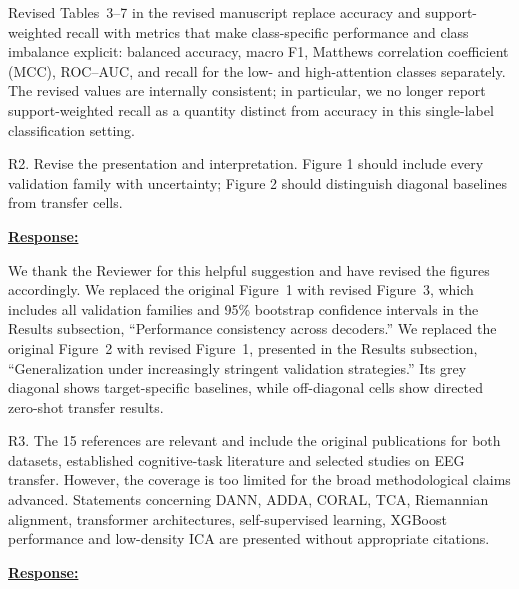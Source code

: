 \documentclass{article}
\begin{document}
Revised Tables~3--7 in the revised manuscript replace accuracy and support-weighted recall with metrics
that make class-specific performance and class imbalance explicit: balanced
accuracy, macro F1, Matthews correlation coefficient (MCC), ROC--AUC, and
recall for the low- and high-attention classes separately. The revised values are
internally consistent; in particular, we no longer report support-weighted
recall as a quantity distinct from accuracy in this single-label classification
setting.

\vspace{0.3cm}


\begin{cmt}{}{}

R2. Revise the presentation and interpretation. Figure 1 should include every
validation family with uncertainty; Figure 2 should distinguish diagonal
baselines from transfer cells.

\end{cmt}
\vspace{0.1cm}
\noindent
\underline{\textbf{Response:}}
\vspace{0.2cm}

We thank the Reviewer for this helpful suggestion and have revised the figures
accordingly. We replaced the original Figure~1 with revised Figure~3, which
includes all validation families and 95\% bootstrap confidence intervals in the
Results subsection, ``Performance consistency across decoders.'' We replaced
the original Figure~2 with revised Figure~1, presented in the Results
subsection, ``Generalization under increasingly stringent validation
strategies.'' Its grey diagonal shows target-specific baselines, while
off-diagonal cells show directed zero-shot transfer results.

\vspace{0.3cm}


\begin{cmt}{}{}

R3. The 15 references are relevant and include the original publications for
both datasets, established cognitive-task literature and selected studies on EEG
transfer. However, the coverage is too limited for the broad methodological
claims advanced. Statements concerning DANN, ADDA, CORAL, TCA, Riemannian
alignment, transformer architectures, self-supervised learning, XGBoost
performance and low-density ICA are presented without appropriate citations.

\end{cmt}
\vspace{0.1cm}
\noindent
\underline{\textbf{Response:}}
\vspace{0.2cm}
\end{document}
